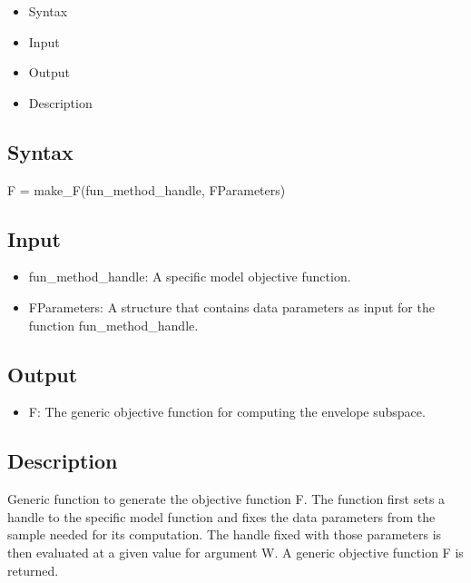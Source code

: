 \documentclass[a4paper,11pt,openany]{memoir}
\begin{document}
\begin{itemize}
\setlength{\itemsep}{-1ex}
   \item Syntax
   \item Input
   \item Output
   \item Description
\end{itemize}


\subsection*{Syntax}

\begin{par}
F = make\_F(fun\_method\_handle, FParameters)
\end{par} \vspace{1em}


\subsection*{Input}

\begin{itemize}
\setlength{\itemsep}{-1ex}
   \item fun\_method\_handle: A specific model objective function.
   \item FParameters: A structure that contains data parameters as input for the function fun\_method\_handle.
\end{itemize}


\subsection*{Output}

\begin{itemize}
\setlength{\itemsep}{-1ex}
   \item F: The generic objective function for computing the envelope subspace.
\end{itemize}


\subsection*{Description}

\begin{par}
Generic function to generate the objective function F. The function first sets a handle to the specific model function and fixes the data parameters from the sample needed for its computation. The handle fixed with those parameters is then evaluated at a given value for argument W. A generic objective function F is returned.
\end{par} \vspace{1em}
\end{document}
